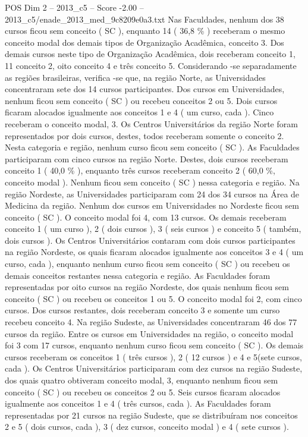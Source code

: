 \begin{textsample}{POS Dim 2 – 2013\_c5 – Score -2.00 – 2013\_c5/enade\_2013\_med\_9c8209e0a3.txt}
Nas Faculdades, nenhum dos 38 cursos ficou sem conceito ( SC ), enquanto 14 ( 36,8 \% ) receberam o mesmo conceito modal dos demais tipos de Organização Acadêmica, conceito 3.
Dos demais cursos neste tipo de Organização Acadêmica, dois receberam conceito 1, 11 conceito 2, oito conceito 4 e três conceito 5.
Considerando -se separadamente as regiões brasileiras, verifica -se que, na região Norte, as Universidades concentraram sete dos 14 cursos participantes.
Dos cursos em Universidades, nenhum ficou sem conceito ( SC ) ou recebeu conceitos 2 ou 5.
Dois cursos ficaram alocados igualmente aos conceitos 1 e 4 ( um curso, cada ).
Cinco receberam o conceito modal, 3.
Os Centros Universitários da região Norte foram representados por dois cursos, destes, todos receberam somente o conceito 2.
Nesta categoria e região, nenhum curso ficou sem conceito ( SC ).
As Faculdades participaram com cinco cursos na região Norte.
Destes, dois cursos receberam conceito 1 ( 40,0 \% ), enquanto três cursos receberam conceito 2 ( 60,0 \%, conceito modal ).
Nenhum ficou sem conceito ( SC ) nessa categoria e região.
Na região Nordeste, as Universidades participaram com 24 dos 34 cursos na Área de Medicina da região.
Nenhum dos cursos em Universidades no Nordeste ficou sem conceito ( SC ).
O conceito modal foi 4, com 13 cursos.
Os demais receberam conceito 1 ( um curso ), 2 ( dois cursos ), 3 ( seis cursos ) e conceito 5 ( também, dois cursos ).
Os Centros Universitários contaram com dois cursos participantes na região Nordeste, os quais ficaram alocados igualmente aos conceitos 3 e 4 ( um curso, cada ), enquanto nenhum curso ficou sem conceito ( SC ) ou recebeu os demais conceitos restantes nessa categoria e região.
As Faculdades foram representadas por oito cursos na região Nordeste, dos quais nenhum ficou sem conceito ( SC ) ou recebeu os conceitos 1 ou 5.
O conceito modal foi 2, com cinco cursos.
Dos cursos restantes, dois receberam conceito 3 e somente um curso recebeu conceito 4.
Na região Sudeste, as Universidades concentraram 46 dos 77 cursos da região.
Entre os cursos em Universidades na região, o conceito modal foi 3 com 17 cursos, enquanto nenhum curso ficou sem conceito ( SC ).
Os demais cursos receberam os conceitos 1 ( três cursos ), 2 ( 12 cursos ) e 4 e 5(sete cursos, cada ).
Os Centros Universitários participaram com dez cursos na região Sudeste, dos quais quatro obtiveram conceito modal, 3, enquanto nenhum ficou sem conceito ( SC ) ou recebeu os conceitos 2 ou 5.
Seis cursos ficaram alocados igualmente aos conceitos 1 e 4 ( três cursos, cada ).
As Faculdades foram representadas por 21 cursos na região Sudeste, que se distribuíram nos conceitos 2 e 5 ( dois cursos, cada ), 3 ( dez cursos, conceito modal ) e 4 ( sete cursos ).

\end{textsample}
